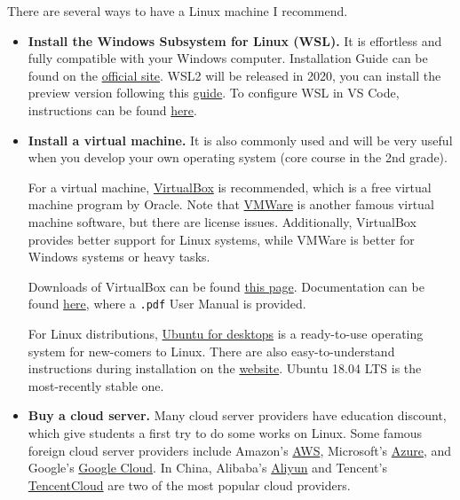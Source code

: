 \documentclass[english]{../TexTemplate/thesis}
\begin{document}
There are several ways to have a Linux machine I recommend.
\begin{itemize}
	\item \textbf{Install the Windows Subsystem for Linux (WSL).}
	It is effortless and fully compatible with your Windows computer.
	Installation Guide can be found on the \href{https://docs.microsoft.com/en-us/windows/wsl/install-win10}{official site}.
	WSL2 will be released in 2020, you can install the preview version following this \href{https://docs.microsoft.com/en-us/windows/wsl/wsl2-install}{guide}.
	To configure WSL in VS Code, instructions can be found \href{https://code.visualstudio.com/docs/remote/wsl}{here}.

	\item \textbf{Install a virtual machine.}
	It is also commonly used and will be very useful when you develop your own operating system (core course in the 2nd grade).

	For a virtual machine, \href{https://www.virtualbox.org/}{VirtualBox} is recommended, which is a free virtual machine program by Oracle. Note that \href{https://www.vmware.com/}{VMWare} is another famous virtual machine software, but there are license issues. Additionally, VirtualBox provides better support for Linux systems, while VMWare is better for Windows systems or heavy tasks.

	Downloads of VirtualBox can be found \href{https://www.virtualbox.org/wiki/Downloads}{this page}. Documentation can be found \href{https://www.virtualbox.org/wiki/Documentation}{here}, where a \verb".pdf" User Manual is provided.

	For Linux distributions, \href{https://www.ubuntu.com/desktop}{Ubuntu for desktops} is a ready-to-use operating system for new-comers to Linux. There are also easy-to-understand instructions during installation on the \href{https://www.ubuntu.com/desktop}{website}. Ubuntu 18.04 LTS is the most-recently stable one.

	\item \textbf{Buy a cloud server.}
	Many cloud server providers have education discount, which give students a first try to do some works on Linux.
	Some famous foreign cloud server providers include Amazon's \href{https://aws.amazon.com/cn/}{AWS}, Microsoft's \href{https://azure.microsoft.com/en-us/}{Azure}, and Google's \href{https://cloud.google.com/}{Google Cloud}.
	In China, Alibaba's \href{https://www.aliyun.com/}{Aliyun} and Tencent's \href{https://cloud.tencent.com/}{TencentCloud} are two of the most popular cloud providers.


\end{itemize}
\end{document}
